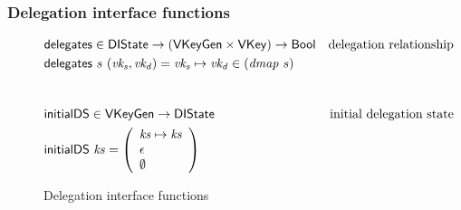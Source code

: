 \subsubsection{Delegation interface functions}
\label{sec:delegation-interface-functions}

\begin{figure}
  \begin{align*}
    & \fun{delegates} \in \DIState \to (\VKeyGen \times \VKey) \to \Bool & \text{delegation relationship}\\
    & \fun{delegates}~s~(\var{vk_s}, \var{vk_d}) = \var{vk_s} \mapsto \var{vk_d} \in (\var{dmap}~s)\\
    \nextdef
    & \fun{initialDS} \in \VKeyGen \to \DIState & \text{initial delegation state}\\
    & \fun{initialDS}~\var{ks} =
      \left(
      \begin{array}{l}
        \var{ks} \mapsto \var{ks}\\
        \epsilon\\
        \emptyset\\
      \end{array}
      \right)
  \end{align*}
  \caption{Delegation interface functions}
\end{figure}
